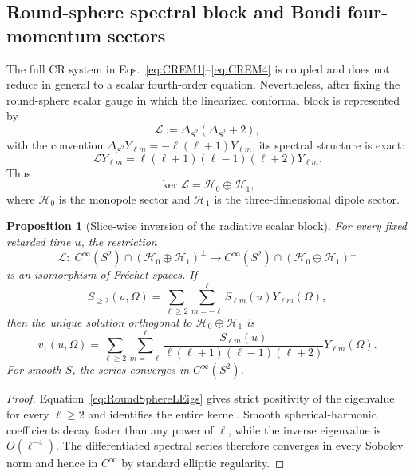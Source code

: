\documentclass[aps,prd,reprint,nofootinbib,superscriptaddress]{revtex4-2}
\newtheorem{proposition}[theorem]{Proposition}
\theoremstyle{definition}
\theoremstyle{remark}
\begin{document}
\subsection{Round-sphere spectral block and Bondi four-momentum sectors}
\label{subsec:BondiSpectralBlock}

The full CR system in Eqs.~\eqref{eq:CREM1}--\eqref{eq:CREM4} is coupled and does not reduce in general to a scalar fourth-order equation. Nevertheless, after fixing the round-sphere scalar gauge in which the linearized conformal block is represented by
\begin{equation}
 \mathcal L:=\Delta_{S^2}(\Delta_{S^2}+2),
 \label{eq:RoundSphereL}
\end{equation}
with the convention $\Delta_{S^2}Y_{\ell m}=-\ell(\ell+1)Y_{\ell m}$, its spectral structure is exact:
\begin{equation}
 \mathcal L Y_{\ell m}
 =\ell(\ell+1)(\ell-1)(\ell+2)Y_{\ell m}.
 \label{eq:RoundSphereLEigs}
\end{equation}
Thus
\begin{equation}
 \ker\mathcal L=\mathcal H_0\oplus\mathcal H_1,
 \label{eq:RoundSphereLKernel}
\end{equation}
where $\mathcal H_0$ is the monopole sector and $\mathcal H_1$ is the three-dimensional dipole sector.

\begin{proposition}[Slice-wise inversion of the radiative scalar block]
\label{prop:SliceWiseFredholm}
For every fixed retarded time $u$, the restriction
\begin{equation}
 \mathcal L:\;C^\infty(S^2)\cap(\mathcal H_0\oplus\mathcal H_1)^\perp
 \longrightarrow C^\infty(S^2)\cap(\mathcal H_0\oplus\mathcal H_1)^\perp
 \label{eq:SliceWiseIso}
\end{equation}
is an isomorphism of Fr\'echet spaces. If
\begin{equation}
 S_{\ge2}(u,\Omega)=\sum_{\ell\ge2}\sum_{m=-\ell}^{\ell}
 S_{\ell m}(u)Y_{\ell m}(\Omega),
\end{equation}
then the unique solution orthogonal to $\mathcal H_0\oplus\mathcal H_1$ is
\begin{equation}
 v_1(u,\Omega)=
 \sum_{\ell\ge2}\sum_{m=-\ell}^{\ell}
 \frac{S_{\ell m}(u)}{\ell(\ell+1)(\ell-1)(\ell+2)}Y_{\ell m}(\Omega).
 \label{eq:SliceWiseSolution}
\end{equation}
For smooth $S$, the series converges in $C^\infty(S^2)$.
\end{proposition}
\begin{proof}
Equation~\eqref{eq:RoundSphereLEigs} gives strict positivity of the eigenvalue for every $\ell\ge2$ and identifies the entire kernel. Smooth spherical-harmonic coefficients decay faster than any power of $\ell$, while the inverse eigenvalue is $O(\ell^{-4})$. The differentiated spectral series therefore converges in every Sobolev norm and hence in $C^\infty$ by standard elliptic regularity.
\end{proof}
\end{document}
